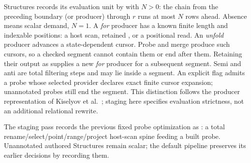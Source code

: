Structures records its evaluation unit by  with
$N>0$: the chain from the preceding boundary (or producer) through $r$ runs
at most $N$ rows ahead. Absence means scalar demand, $N=1$. A \emph{for}
producer has a known finite length and indexable positions: a host scan,
retained , or a positional read. An \emph{unfold} producer advances
a state-dependent cursor. Probe and merge produce such cursors, so a checked
segment cannot contain them or end after them. Retaining their output as
 supplies a new \emph{for} producer for a subsequent segment.
Semi and anti are total filtering steps and may lie inside a segment.
An explicit  flag admits a probe whose selected provider declares
exact finite cursor expansion; unannotated probes still end the segment.
This distinction follows the producer representation of
Kiselyov et al.~\cite{paper-stream-fusion}; staging here specifies evaluation
strictness, not an additional relational rewrite.
\begin{mathpar}
\end{mathpar}
The staging pass records the previous fixed probe optimization as
: a total rename/select/point/range/project host-scan
spine feeding a built probe. Unannotated authored Structures remain scalar;
the default pipeline preserves its earlier decisions by recording them.

